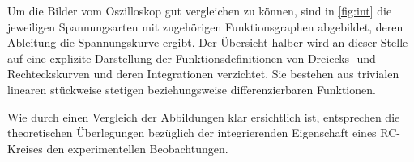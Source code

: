Um die Bilder vom Oszilloskop gut vergleichen zu können, sind in \ref{fig:int}  
die jeweiligen Spannungsarten mit zugehörigen Funktionsgraphen abgebildet, deren Ableitung die Spannungskurve ergibt. 
Der Übersicht halber wird an dieser Stelle auf eine explizite Darstellung der Funktionsdefinitionen von Dreiecks- und Rechteckskurven 
und deren Integrationen verzichtet. Sie bestehen aus trivialen linearen stückweise stetigen beziehungsweise differenzierbaren 
Funktionen. 

Wie durch einen Vergleich der Abbildungen klar ersichtlich ist, entsprechen die theoretischen Überlegungen bezüglich der 
integrierenden Eigenschaft eines RC-Kreises den experimentellen Beobachtungen. 